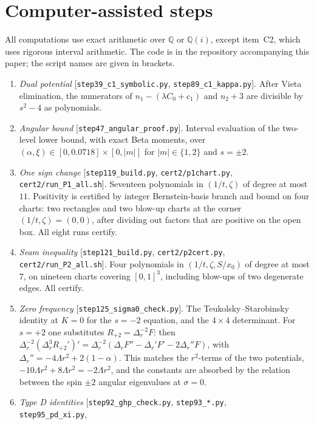 \documentclass[11pt]{amsart}
\theoremstyle{definition}
\theoremstyle{remark}
\numberwithin{equation}{section}
\begin{document}
\section{Computer-assisted steps}\label{app:cert}\sloppy
All computations use exact arithmetic over $\mathbb Q$ or $\mathbb Q(i)$, except item~C2, which uses rigorous interval
arithmetic. The code is in the repository accompanying this paper; the script names are given in brackets.
\begin{enumerate}[label=C\arabic*.,leftmargin=*]
\item \emph{Dual potential} [\texttt{step39\_c1\_symbolic.py}, \texttt{step89\_c1\_kappa.py}]. After Vieta
elimination, the numerators of $n_1-(\lambda C_0+c_1)$ and $n_2+3$ are divisible by $s^2-4$ as polynomials.
\item \emph{Angular bound} [\texttt{step47\_angular\_proof.py}]. Interval evaluation of the two-level lower bound,
with exact Beta moments, over $(\alpha,\xi)\in[0,0.0718]\times[0,|m|]$ for $|m|\in\{1,2\}$ and $s=\pm2$.
\item \emph{One sign change} [\texttt{step119\_build.py}, \texttt{cert2/p1chart.py}, \texttt{cert2/run\_P1\_all.sh}].
Seventeen polynomials in $(1/t,\zeta)$ of degree at most $11$. Positivity is certified by integer Bernstein-basis
branch and bound on four charts: two rectangles and two blow-up charts at the corner $(1/t,\zeta)=(0,0)$, after
dividing out factors that are positive on the open box. All eight runs certify.
\item \emph{Seam inequality} [\texttt{step121\_build.py}, \texttt{cert2/p2cert.py}, \texttt{cert2/run\_P2\_all.sh}].
Four polynomials in $(1/t,\zeta,S/x_0)$ of degree at most $7$, on nineteen charts covering $[0,1]^3$, including
blow-ups of two degenerate edges. All certify.
\item \emph{Zero frequency} [\texttt{step125\_sigma0\_check.py}]. The Teukolsky--Starobinsky identity at $K=0$ for
the $s=-2$ equation, and the $4\times4$ determinant. For $s=+2$ one substitutes $R_{+2}=\Delta_r^{-2}F$: then
$\Delta_r^{-2}(\Delta_r^3R_{+2}')'=\Delta_r^{-2}(\Delta_rF''-\Delta_r'F'-2\Delta_r''F)$, with
$\Delta_r''=-4\Lambda r^2+2(1-\alpha)$. This matches the $r^2$-terms of the two potentials, $-10\Lambda r^2+8\Lambda r^2=-2\Lambda r^2$,
and the constants are absorbed by the relation between the spin $\pm2$ angular eigenvalues at $\sigma=0$.
\item \emph{Type D identities} [\texttt{step92\_ghp\_check.py}, \texttt{step93\_*.py},\\ \texttt{step95\_pd\_xi.py},

\end{enumerate}
\end{document}
